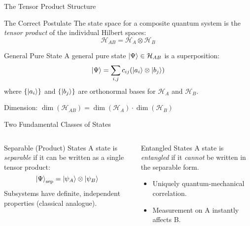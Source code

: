 \begin{frame}{The Tensor Product Structure}
  \begin{block}{The Correct Postulate}
    The state space for a composite quantum system is the
    \emph{tensor product} of the individual Hilbert spaces:
    \begin{equation}
      \mathcal{H}_{AB} = \mathcal{H}_A \otimes \mathcal{H}_B
    \end{equation}
  \end{block}
  \pause
  \begin{block}{General Pure State}
    A general pure state $\ket{\Psi} \in \mathcal{H}_{AB}$ is a superposition:
    \begin{equation}
      \ket{\Psi} = \sum_{i,j} c_{ij} (\ket{a_i} \otimes \ket{b_j})
    \end{equation}
    where $\{\ket{a_i}\}$ and $\{\ket{b_j}\}$ are orthonormal bases for
    $\mathcal{H}_A$ and $\mathcal{H}_B$.
    \pause
    \begin{center}
      Dimension:
      \( \dim(\mathcal{H}_{AB}) = \dim(\mathcal{H}_A) \cdot \dim(\mathcal{H}_B) \)
    \end{center}
  \end{block}
\end{frame}

\begin{frame}{Two Fundamental Classes of States}
  \begin{columns}[T]
    \begin{column}{0.5\textwidth}
      \begin{block}{Separable (Product) States}
        A state is \emph{separable} if it can be written as a single tensor product:
        \begin{equation}
          \ket{\Psi}_{\text{sep}} = \ket{\psi_A} \otimes \ket{\psi_B}
        \end{equation}
        Subsystems have definite, independent properties (classical analogue).
      \end{block}
    \end{column}
    \pause
    \begin{column}{0.5\textwidth}
      \begin{alertblock}{Entangled States}
        A state is \emph{entangled} if it \emph{cannot} be written in the
        separable form.
        \begin{itemize}
          \item Uniquely quantum-mechanical correlation.
          \item Measurement on A instantly affects B.
        \end{itemize}
      \end{alertblock}
    \end{column}
  \end{columns}
\end{frame}

